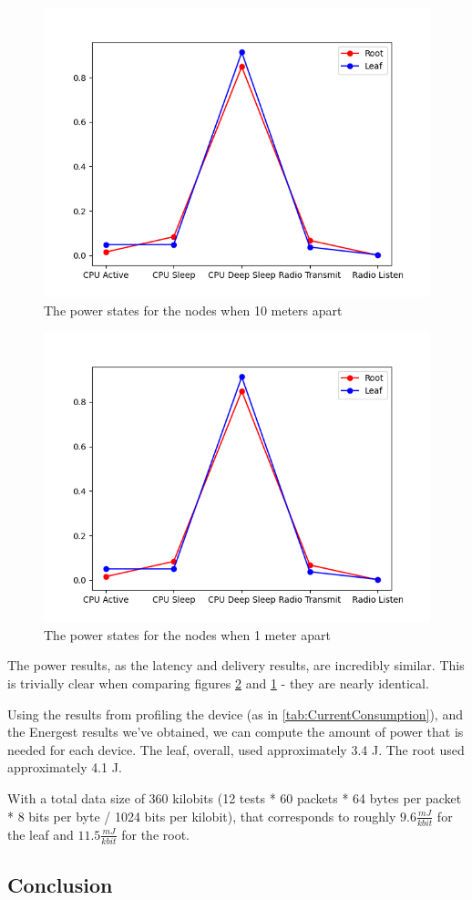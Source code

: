 \documentclass[conference]{IEEEtran}
\begin{document}
\begin{figure}[]
	\centering
	\includegraphics[width=.5\textwidth,keepaspectratio]{powerstates_10m.png}
	\caption{The power states for the nodes when 10 meters apart}
	\label{fig:power10m}
\end{figure}
\begin{figure}[]
	\centering
	\includegraphics[width=.5\textwidth,keepaspectratio]{powerstates_1m.png}
	\caption{The power states for the nodes when 1 meter apart}
	\label{fig:power1m}
\end{figure}

The power results, as the latency and delivery results, are incredibly similar. This is trivially clear when comparing figures \ref{fig:power1m} and \ref{fig:power10m} - they are nearly identical. 

Using the results from profiling the device (as in \ref{tab:CurrentConsumption}), and the Energest results we've obtained, we can compute the amount of power that is needed for each device. The leaf, overall, used approximately 3.4 J. The root used approximately 4.1 J.

With a total data size of 360 kilobits (12 tests * 60 packets * 64 bytes per packet * 8 bits per byte / 1024 bits per kilobit), that corresponds to roughly $9.6 \frac{mJ}{kbit}$ for the leaf and $11.5 \frac{mJ}{kbit}$ for the root.


\subsection{Conclusion}
\end{document}
